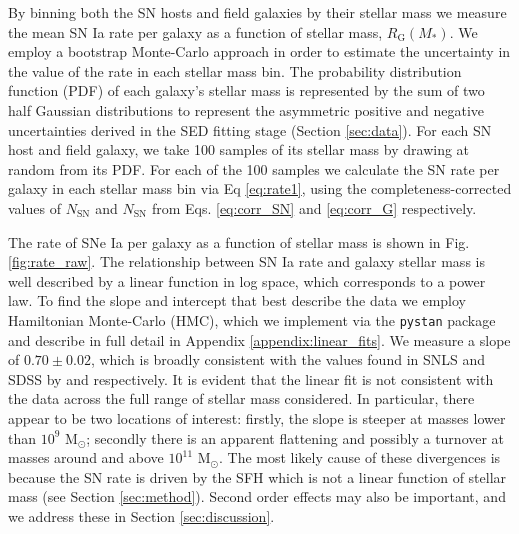 \documentclass[fleqn,usenatbib]{mnras}
\begin{document}
By binning both the SN hosts and field galaxies by their stellar mass we measure the mean SN Ia rate per galaxy as a function of stellar mass, $R_{\mathrm{G}}(M_*)$. We employ a bootstrap Monte-Carlo approach in order to estimate the uncertainty in the value of the rate in each stellar mass bin. The probability distribution function (PDF) of each galaxy's stellar mass is represented by the sum of two half Gaussian distributions to represent the asymmetric positive and negative uncertainties derived in the SED fitting stage (Section \ref{sec:data}). For each SN host and field galaxy, we take 100 samples of its stellar mass by drawing at random from its PDF. For each of the 100 samples we calculate the SN rate per galaxy in each stellar mass bin via Eq \ref{eq:rate1}, using the completeness-corrected values of $N_{\mathrm{SN}}$ and $N_{\mathrm{SN}}$ from Eqs. \ref{eq:corr_SN} and \ref{eq:corr_G} respectively. 

The rate of SNe Ia per galaxy as a function of stellar mass is shown in Fig. \ref{fig:rate_raw}. The relationship between SN Ia rate and galaxy stellar mass is well described by a linear function in log space, which corresponds to a power law. To find the slope and intercept that best describe the data we employ Hamiltonian Monte-Carlo (HMC), which we implement via the \texttt{pystan} package and describe in full detail in Appendix \ref{appendix:linear_fits}. We measure a slope of $0.70\pm0.02$, which is broadly consistent with the values found in SNLS and SDSS by \citet{Sullivan2006} and \citet{Smith2012} respectively. It is evident that the linear fit is not consistent with the data across the full range of stellar mass considered. In particular, there appear to be two locations of interest: firstly, the slope is steeper at masses lower than $10^9$ M$_{\odot}$; secondly there is an apparent flattening and possibly a turnover at masses around and above $10^11$ M$_{\odot}$. The most likely cause of these divergences is because the SN rate is driven by the SFH which is not a linear function of stellar mass (see Section \ref{sec:method}). Second order effects may also be important, and we address these in Section \ref{sec:discussion}.
\end{document}

